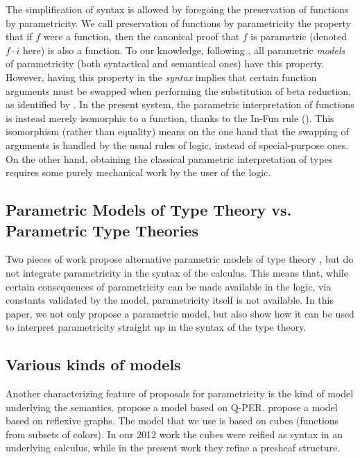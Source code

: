 \documentclass[english]{PaperTools/latex/lipics}
\newcommand\param[1]{\!\cdot\!#1}
\begin{document}
The simplification of syntax is allowed by foregoing the preservation
of functions by parametricity. We call preservation of functions by
parametricity the property that if $f$ were a function, then the
canonical proof that $f$ is parametric (denoted $f \param i$ here) is
also a function. To our knowledge, following \citet{reynolds_types_1983}, all parametric \emph{models} of parametricity (both syntactical and semantical ones) have this property.
However, having this property in the \emph{syntax} implies that
certain function arguments must be swapped when performing the
substitution of beta reduction, as identified by
\citet{bernardy_computational_2012}.  In the present system, the
parametric interpretation of functions is instead merely isomorphic to
a function, thanks to the {\sc In-Fun} rule (). This
isomorphism (rather than equality) means on the one hand that the
swapping of arguments is handled by the usual rules of logic, instead
of special-purpose ones. On the other hand, obtaining the classical
parametric interpretation of types requires some purely mechanical
work by the user of the logic.

\subsection{Parametric Models of Type Theory vs. Parametric Type Theories}

Two pieces of work propose alternative parametric models of
type theory
\citep{atkey_relationally_2014,krishnaswami_internalizing_2013}, but
do not integrate parametricity in the syntax of the calculus. This
means that, while certain consequences of parametricity can be made
available in the logic, via constants validated by the model,
parametricity itself is not available. In this paper, we not only
propose a parametric model, but also show how it can be used to
interpret parametricity straight up in the syntax of the type theory.


\subsection{Various kinds of models}
Another characterizing feature of proposals for parametricity is the
kind of model underlying the
semantics.  propose a model
based on Q-PER.  propose a model based
on reflexive graphs. The model that we use is based on cubes
(functions from subsets of colors). In
our 2012 work the cubes were reified as syntax in
an underlying calculus, while in the present work they refine a presheaf structure.
\end{document}
